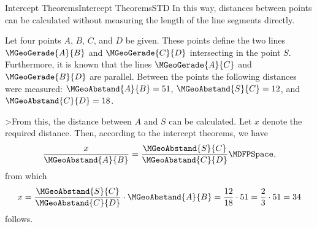 \begin{MXContent}{Intercept Theorems}{Intercept Theorems}{STD}
In this way, distances between points can be calculated without 
measuring the length of the line segments directly.

\begin{MExample}
Let four points $A$, $B$, $C$, and $D$ be given. These points define the
two lines $\MGeoGerade{A}{B}$ and $\MGeoGerade{C}{D}$ intersecting in the point $S$. 
Furthermore, it is known that the lines $\MGeoGerade{A}{C}$ and $\MGeoGerade{B}{D}$ 
are parallel. Between the points the following distances were measured: 
$\MGeoAbstand{A}{B} = 51$, $\MGeoAbstand{S}{C} = 12 $, and 
$\MGeoAbstand{C}{D} = 18$.

\begin{center}
\end{center}

>From this, the distance between $A$ and $S$ can be calculated. Let $x$ denote the 
required distance. Then, according to the intercept theorems, we have
\[
   \frac{x}{\MGeoAbstand{A}{B}}
 = \frac{\MGeoAbstand{S}{C}}{\MGeoAbstand{C}{D}} \MDFPSpace,
\]
from which
\[
x = \frac{\MGeoAbstand{S}{C}}{\MGeoAbstand{C}{D}} \cdot \MGeoAbstand{A}{B} %
 = \frac{12}{18} \cdot 51 = \frac{2}{3} \cdot 51 = 34 %
\]
follows.
\end{MExample}
\end{MXContent}


